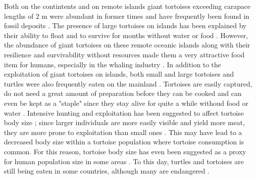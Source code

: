 Both on the contintents and on remote islands giant tortoises exceeding carapace lengths of 2 m were abundant in former times and have frequently been found in fossil deposits \citep{Rhodin2015,Pritchard2013}. The presence of large tortoises on islands has been explained by their ability to float and to survive for months without water or food \citep{Gerlach2006, Patterson1973, Cheke2016}. 
However, the abundance of giant tortoises on these remote oceanic islands along with their resilience and survivability without resources made them a very attractive food item for humans, especially in the whaling industry \citep{Townsend1925}. 
In addition to the exploitation of giant tortoises on islands, both small and large tortoises and turtles were also frequently eaten on the mainland \citep{Thompson2014}.
Tortoises are easily captured, do not need a great amount of preparation before they can be cooked and can even be kept as a "staple" since they stay alive for quite a while withoud food or water \citep{Thompson2002,Thompson2014}. Intensive hunting and exploitation has been suggested to affect tortoise body size \citep{Speth2002}; since larger individuals are more easily visible and yield more meat, they are more prone to exploitation than small ones \citep{Rhodin2015}. This may have lead to a decreased body size within a tortoise population where tortoise consumption is common.
For this reason, tortoise body size has even been suggested as a proxy for human population size in some areas \citep{Steele2005,Stiner1999}.
To this day, turtles and tortoises are still being eaten in some countries, although many are endangered \citep{Rhodin2015}.

